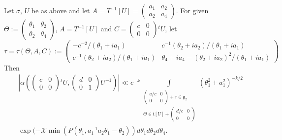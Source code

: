 \begin{sublemma}\label{c1:lem-1.4.18}
Let $\sigma$, $U$ be as above and let
$A=T^{-1}[U]=\left(\begin{smallmatrix} a_{1} & a_{2}\\ a_{2} & a_{4}
\end{smallmatrix}\right)$. For given
$\Theta:=\left(\begin{smallmatrix} \theta_{1} &
  \theta_{2}\\ \theta_{2} & \theta_{4}
\end{smallmatrix}\right)$, $A=T^{-1}[U]$ and
$C=\left(\begin{smallmatrix} c & 0\\ 0 & 0
\end{smallmatrix}\right){}^{t}U$, let
{\fontsize{10}{12}\selectfont
$$
\tau=\tau(\Theta,A,C):=
\begin{pmatrix}
-c^{-2}/(\theta_{1}+ia_{1}) &
c^{-1}(\theta_{2}+ia_{2})/(\theta_{1}+ia_{1})\\
c^{-1}(\theta_{2}+ia_{2})/(\theta_{1}+ia_{1}) &
\theta_{4}+ia_{4}-(\theta_{2}+ia_{2})^{2}/(\theta_{1}+ia_{1}) 
\end{pmatrix}
$$}
Then
\begin{align*}
& |\alpha\left(
\begin{pmatrix}
c & 0\\
0 & 0
\end{pmatrix}
{}^{t}U,
\begin{pmatrix}
d & 0\\
0 & 1
\end{pmatrix}
U^{-1}\right)|
\ll c^{-k}\int\limits_{\substack{\left(\begin{smallmatrix} a/c & 0\\ 0
      & 0    \end{smallmatrix}\right)+\tau
    \in\mathfrak{g}_{2}\\ \Theta\in\mathfrak{t}[U]+\left(\begin{smallmatrix}
      d/c & 0\\ 0 &
      0    \end{smallmatrix}\right)}}(\theta^{2}_{1}+a^{2}_{1})^{-k/2}\\
&\exp(-\mathscr{X}\min(P(\theta_{1},a^{-1}_{1}a_{2}\theta_{1}-\theta_{2}))d\theta_{1}d\theta_{2}d\theta_{4}. 
\end{align*}
\end{sublemma}


